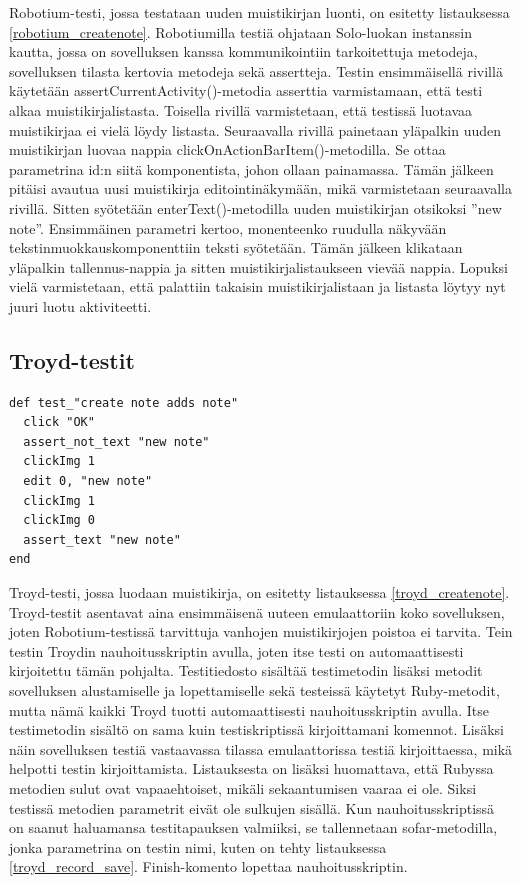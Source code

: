 Robotium-testi, jossa testataan uuden muistikirjan luonti, on esitetty listauksessa \ref{robotium_createnote}. Robotiumilla testiä ohjataan Solo-luokan instanssin kautta, jossa on sovelluksen kanssa kommunikointiin tarkoitettuja metodeja, sovelluksen tilasta kertovia metodeja sekä assertteja. Testin ensimmäisellä rivillä käytetään assertCurrentActivity()-metodia asserttia varmistamaan, että testi alkaa muistikirjalistasta. Toisella rivillä varmistetaan, että testissä luotavaa muistikirjaa ei vielä löydy listasta. Seuraavalla rivillä painetaan yläpalkin uuden muistikirjan luovaa nappia clickOnActionBarItem()-metodilla. Se ottaa parametrina id:n siitä komponentista, johon ollaan painamassa. Tämän jälkeen pitäisi avautua uusi muistikirja editointinäkymään, mikä varmistetaan seuraavalla rivillä. Sitten syötetään enterText()-metodilla uuden muistikirjan otsikoksi ''new note''. Ensimmäinen parametri kertoo, monenteenko ruudulla näkyvään tekstinmuokkauskomponenttiin teksti syötetään. Tämän jälkeen klikataan yläpalkin tallennus-nappia ja sitten muistikirjalistaukseen vievää nappia. Lopuksi vielä varmistetaan, että palattiin takaisin muistikirjalistaan ja listasta löytyy nyt juuri luotu aktiviteetti.

\subsection{Troyd-testit}

\begin{lstlisting}[float, label=troyd_createnote,caption=Muistikirjan luontitesti Troydilla]
def test_"create note adds note"
  click "OK"
  assert_not_text "new note"
  clickImg 1
  edit 0, "new note"
  clickImg 1
  clickImg 0
  assert_text "new note"
end
\end{lstlisting}

Troyd-testi, jossa luodaan muistikirja, on esitetty listauksessa \ref{troyd_createnote}. Troyd-testit asentavat aina ensimmäisenä uuteen emulaattoriin koko sovelluksen, joten Robotium-testissä tarvittuja vanhojen muistikirjojen poistoa ei tarvita. Tein testin Troydin nauhoitusskriptin avulla, joten itse testi on automaattisesti kirjoitettu tämän pohjalta. Testitiedosto sisältää testimetodin lisäksi metodit sovelluksen alustamiselle ja lopettamiselle sekä testeissä käytetyt Ruby-metodit, mutta nämä kaikki Troyd tuotti automaattisesti nauhoitusskriptin avulla. Itse testimetodin sisältö on sama kuin testiskriptissä kirjoittamani komennot. Lisäksi näin sovelluksen testiä vastaavassa tilassa emulaattorissa testiä kirjoittaessa, mikä helpotti testin kirjoittamista. Listauksesta on lisäksi huomattava, että Rubyssa metodien sulut ovat vapaaehtoiset, mikäli sekaantumisen vaaraa ei ole. Siksi testissä metodien parametrit eivät ole sulkujen sisällä. Kun nauhoitusskriptissä on saanut haluamansa testitapauksen valmiiksi, se tallennetaan sofar-metodilla, jonka parametrina on testin nimi, kuten on tehty listauksessa \ref{troyd_record_save}. Finish-komento lopettaa nauhoitusskriptin.

